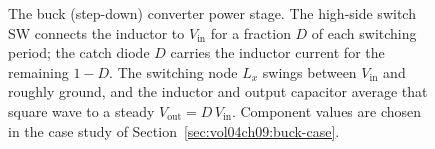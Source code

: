 \begin{figure}[htbp]
\caption[Buck converter power stage]{The buck (step-down) converter
power stage. The high-side switch SW connects the inductor to $V_{\text{in}}$
for a fraction $D$ of each switching period; the catch diode $D$ carries the
inductor current for the remaining $1-D$. The switching node $L_x$ swings
between $V_{\text{in}}$ and roughly ground, and the inductor and output
capacitor average that square wave to a steady $V_{\text{out}} = D\,
V_{\text{in}}$. Component values are chosen in the case study of
Section~\ref{sec:vol04ch09:buck-case}.}
\label{fig:vol04ch09:buck-topology}
\end{figure}
